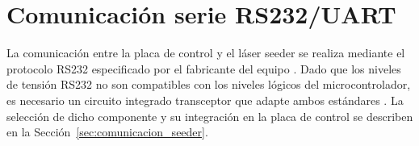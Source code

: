 \section{Comunicaci\'on serie RS232/UART}
\label{sec:rs232_uart}

La comunicaci\'on entre la placa de control y el l\'aser seeder se
realiza mediante el protocolo RS232 especificado por el fabricante del
equipo \cite{informeMarzo2026}. Dado que los niveles de tensi\'on RS232
no son compatibles con los niveles l\'ogicos del microcontrolador, es
necesario un circuito integrado transceptor que adapte ambos est\'andares
\cite{sat2026}. La selecci\'on de dicho componente y su integraci\'on en
la placa de control se describen en la
Secci\'on~\ref{sec:comunicacion_seeder}.
